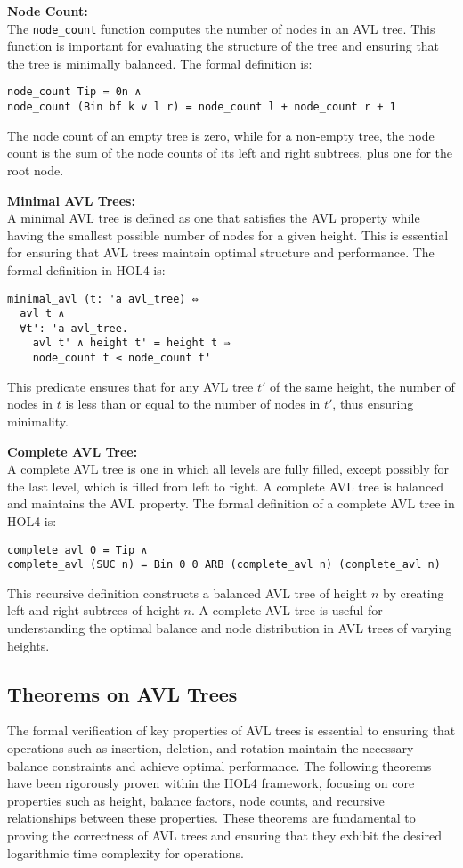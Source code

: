 \documentclass[12pt]{article}
\begin{document}
\textbf{Node Count:} \\
The \texttt{node\_count} function computes the number of nodes in an AVL tree. This function is important for evaluating the structure of the tree and ensuring that the tree is minimally balanced. The formal definition is:
\begin{verbatim}
node_count Tip = 0n ∧
node_count (Bin bf k v l r) = node_count l + node_count r + 1
\end{verbatim}
The node count of an empty tree is zero, while for a non-empty tree, the node count is the sum of the node counts of its left and right subtrees, plus one for the root node.

\textbf{Minimal AVL Trees:} \\
A minimal AVL tree is defined as one that satisfies the AVL property while having the smallest possible number of nodes for a given height. This is essential for ensuring that AVL trees maintain optimal structure and performance. The formal definition in HOL4 is:
\begin{verbatim}
minimal_avl (t: 'a avl_tree) ⇔
  avl t ∧
  ∀t': 'a avl_tree.
    avl t' ∧ height t' = height t ⇒
    node_count t ≤ node_count t'
\end{verbatim}
This predicate ensures that for any AVL tree \( t' \) of the same height, the number of nodes in \( t \) is less than or equal to the number of nodes in \( t' \), thus ensuring minimality.

\textbf{Complete AVL Tree:} \\
A complete AVL tree is one in which all levels are fully filled, except possibly for the last level, which is filled from left to right. A complete AVL tree is balanced and maintains the AVL property. The formal definition of a complete AVL tree in HOL4 is:
\begin{verbatim}
complete_avl 0 = Tip ∧
complete_avl (SUC n) = Bin 0 0 ARB (complete_avl n) (complete_avl n)
\end{verbatim}
This recursive definition constructs a balanced AVL tree of height \( n \) by creating left and right subtrees of height \( n \). A complete AVL tree is useful for understanding the optimal balance and node distribution in AVL trees of varying heights.


\subsection{Theorems on AVL Trees}
The formal verification of key properties of AVL trees is essential to ensuring that operations such as insertion, deletion, and rotation maintain the necessary balance constraints and achieve optimal performance. The following theorems have been rigorously proven within the HOL4 framework, focusing on core properties such as height, balance factors, node counts, and recursive relationships between these properties. These theorems are fundamental to proving the correctness of AVL trees and ensuring that they exhibit the desired logarithmic time complexity for operations.
\end{document}
